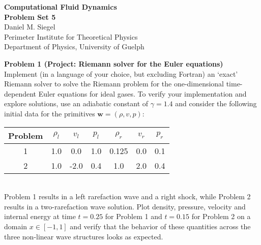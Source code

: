 \documentclass[letter,11pt]{article}
\begin{document}
\pagestyle{problem_set}


\phantom{.}
\begin{center}
{\Large\textbf{Computational Fluid Dynamics\\[0.4cm] Problem Set 5}} \\[0.7cm]
Daniel M. Siegel \\[0.1cm]
Perimeter Institute for Theoretical Physics\\
Department of Physics, University of Guelph
\end{center}

\vspace{1cm}

{\noindent\large\textbf{Problem 1 (Project: Riemann solver for the Euler equations)}}\\[0.1cm]

\noindent Implement (in a language of your choice, but excluding Fortran) an `exact' Riemann solver to solve the Riemann problem for the one-dimensional time-dependent Euler equations for ideal gases. To verify your implementation and explore solutions, use an adiabatic constant of $\gamma=1.4$ and consider the following initial data for the primitives $\mathbf{w}=(\rho,v,p)$:\\

\begin{tabular}{c|c|c|c|c|c|c}
  Problem & $\rho_l$ & $v_l$ & $p_l$ & $\rho_r$ & $v_r$ & $p_r$ \\
  \hline
  1 & 1.0 & 0.0 & 1.0 & 0.125 & 0.0 & 0.1 \\
  2 & 1.0 & -2.0 & 0.4 & 1.0 & 2.0 & 0.4 \\
\end{tabular}\\

\noindent Problem 1 results in a left rarefaction wave and a right shock, while Problem 2 results in a two-rarefaction wave solution. Plot density, pressure, velocity and internal energy at time $t = 0.25$ for Problem 1 and $t=0.15$ for Problem 2 on a domain $x\in [-1,1]$ and verify that the behavior of these quantities across the three non-linear wave structures looks as expected.\\
\end{document}
